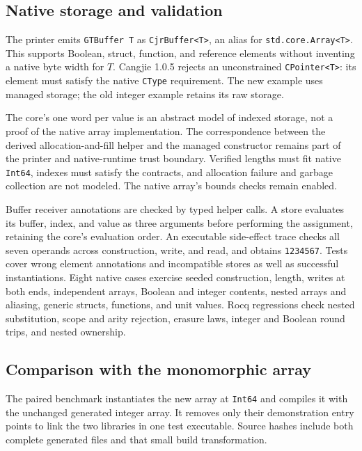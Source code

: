 \subsection{Native storage and validation}

The printer emits \texttt{GTBuffer T} as \texttt{CjrBuffer<T>}, an alias
for \texttt{std.core.Array<T>}. This supports Boolean, struct, function,
and reference elements without inventing a native byte width for $T$.
Cangjie 1.0.5 rejects an unconstrained \texttt{CPointer<T>}: its element
must satisfy the native \texttt{CType} requirement. The new example uses
managed storage; the old integer example retains its raw storage.

The core's one word per value is an abstract model of indexed storage,
not a proof of the native array implementation. The correspondence between
the derived allocation-and-fill helper and the managed constructor remains
part of the printer and native-runtime trust boundary. Verified lengths
must fit native \texttt{Int64}, indexes must satisfy the contracts, and
allocation failure and garbage collection are not modeled. The native
array's bounds checks remain enabled.

Buffer receiver annotations are checked by typed helper calls. A store
evaluates its buffer, index, and value as three arguments before performing
the assignment, retaining the core's evaluation order. An executable
side-effect trace checks all seven operands across construction, write,
and read, and obtains \texttt{1234567}. Tests cover wrong
element annotations and incompatible stores as well as successful
instantiations. Eight native cases exercise seeded construction, length,
writes at both ends, independent arrays, Boolean and integer contents,
nested arrays and aliasing, generic structs, functions, and unit values.
Rocq regressions check nested substitution, scope and arity rejection,
erasure laws, integer and Boolean round trips, and nested ownership.

\subsection{Comparison with the monomorphic array}
\label{sec:poly-array-benchmark}

The paired benchmark instantiates the new array at \texttt{Int64} and
compiles it with the unchanged generated integer array. It removes only
their demonstration entry points to link the two libraries in one test
executable. Source hashes include both complete generated files and that
small build transformation.

